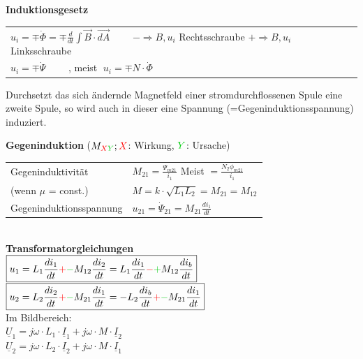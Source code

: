 \renewcommand{\arraystretch}{1.5}
\textbf{Induktionsgesetz}\\
		\begin{tabular}[c]{p{8.7cm}}
			$u_i= \mp \dot{\Phi} = \mp \frac{d}{dt} \int \vec{B} \cdot
			\vec{dA}\qquad $ \parbox{3cm}{\tiny{$- \Rightarrow B,u_i $
			Rechtsschraube\\ $+ \Rightarrow B,u_i $
			Linksschraube}}
			\\
			
			$u_i= \mp \dot{\Psi}\qquad$ , meist $\; u_i = \mp
			N\cdot\dot{\Phi}$		
		\end{tabular}
		\parbox{8cm}{Durchsetzt das sich \"andernde Magnetfeld einer stromdurchflossenen Spule
					eine zweite Spule, so wird auch in dieser eine Spannung
					(=Gegeninduktionsspannung) induziert.}	

\begin{multicols}{2}
 		\textbf{Gegeninduktion} ($M_{\textcolor{red}{X}\textcolor{green}{Y}}; \textcolor{red}{X}$: Wirkung,
 		$\textcolor{green}{Y}$: Ursache)\\
		\begin{tabular}{ll}
  		Gegeninduktivit\"at
  			& $M_{21} = \frac{\Psi_{m21}}{i_1}$ Meist $= \frac{N_2 \phi_{m21}}{i_1}$\\ 
  			(wenn $\mu$ = const.) & $M = k \cdot \sqrt{L_1 L_2} = M_{21} = M_{12} $  \\
  			Gegeninduktionsspannung
  			& $u_{21} = \dot{\Psi}_{21} = M_{21} \frac{di_1}{dt}$ \\
		\end{tabular}\\

  		\textbf{Transformatorgleichungen}\\
		$\boxed{u_1 = L_1 \dfrac{di_1}{dt} \textcolor{red}{+}\textcolor{green}{-}M_{12}
		\dfrac{di_2}{dt} = L_1 \dfrac{di_1}{dt} \textcolor{red}{-}\textcolor{green}{+}M_{12} \dfrac{di_b}{dt}}$ \\
		$\boxed{u_2 = L_2 \dfrac{di_2}{dt}\textcolor{red}{+}\textcolor{green}{-} M_{21}
		\dfrac{d i_1}{dt} = -L_2 \dfrac{di_b}{dt}
		\textcolor{red}{+}\textcolor{green}{-} M_{21} \dfrac{d i_1}{dt}}$\\
		Im Bildbereich:\\
		$\underline{U}_1 = j\omega\cdot L_1 \cdot \underline{I}_1 + j\omega\cdot M \cdot \underline{I}_2$\\
		$\underline{U}_2 = j\omega\cdot L_2 \cdot \underline{I}_2 + j\omega\cdot M \cdot \underline{I}_1$\\
  			

\end{multicols}
